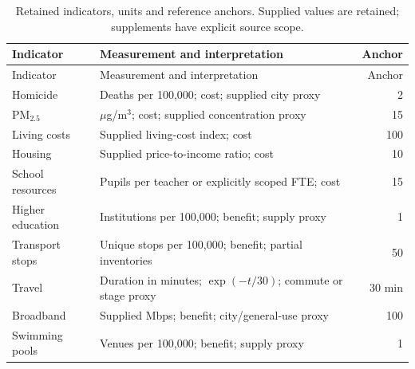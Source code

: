 \begin{longtable}{p{.22\linewidth}p{.56\linewidth}r}
\caption{Retained indicators, units and reference anchors. Supplied values are retained; supplements have explicit source scope.}\label{tab:indicators}\\
\toprule Indicator & Measurement and interpretation & Anchor\\\midrule
\endfirsthead
\toprule Indicator & Measurement and interpretation & Anchor\\\midrule\endhead
Homicide & Deaths per 100,000; cost; supplied city proxy & 2 \\
PM$_{2.5}$ & $\mu$g/m$^3$; cost; supplied concentration proxy & 15 \\
Living costs & Supplied living-cost index; cost & 100 \\
Housing & Supplied price-to-income ratio; cost & 10 \\
School resources & Pupils per teacher or explicitly scoped FTE; cost & 15 \\
Higher education & Institutions per 100,000; benefit; supply proxy & 1 \\
Transport stops & Unique stops per 100,000; benefit; partial inventories & 50 \\
Travel & Duration in minutes; $\exp(-t/30)$; commute or stage proxy & 30 min \\
Broadband & Supplied Mbps; benefit; city/general-use proxy & 100 \\
Swimming pools & Venues per 100,000; benefit; supply proxy & 1 \\
\bottomrule
\end{longtable}
